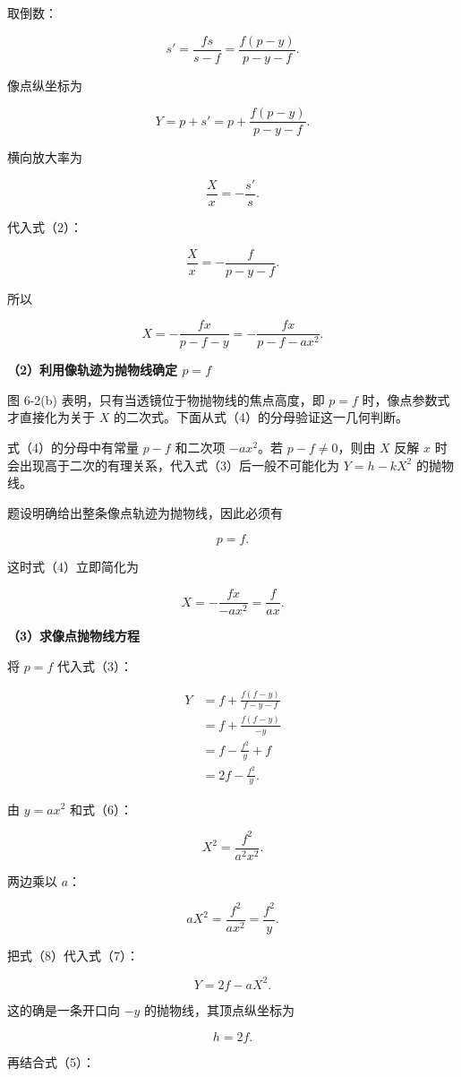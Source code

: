 \documentclass[12pt,a4paper,UTF8]{ctexart}
\begin{document}
取倒数：

\[
s'=\frac{fs}{s-f}
=\frac{f(p-y)}{p-y-f}.\tag{2}
\]

像点纵坐标为

\[
Y=p+s'
=p+\frac{f(p-y)}{p-y-f}.\tag{3}
\]

横向放大率为

\[
\frac Xx=-\frac{s'}s.
\]

代入式（2）：

\[
\frac Xx=-\frac{f}{p-y-f}.
\]

所以

\[
X=-\frac{fx}{p-f-y}
=-\frac{fx}{p-f-ax^2}.\tag{4}
\]

\textbf{（2）利用像轨迹为抛物线确定 \(p=f\)}

图 6-2(b) 表明，只有当透镜位于物抛物线的焦点高度，即 \(p=f\)
时，像点参数式才直接化为关于 \(X\)
的二次式。下面从式（4）的分母验证这一几何判断。

式（4）的分母中有常量 \(p-f\) 和二次项 \(-ax^2\)。若 \(p-f\ne0\)，则由
\(X\) 反解 \(x\) 时会出现高于二次的有理关系，代入式（3）后一般不可能化为
\(Y=h-kX^2\) 的抛物线。

题设明确给出整条像点轨迹为抛物线，因此必须有

\[
\boxed{p=f}.\tag{5}
\]

这时式（4）立即简化为

\[
X=-\frac{fx}{-ax^2}
=\frac{f}{ax}.\tag{6}
\]

\textbf{（3）求像点抛物线方程}

将 \(p=f\) 代入式（3）：

\[
\begin{aligned}
Y
&=f+\frac{f(f-y)}{f-y-f}\\
&=f+\frac{f(f-y)}{-y}\\
&=f-\frac{f^2}{y}+f\\
&=2f-\frac{f^2}{y}.
\end{aligned}\tag{7}
\]

由 \(y=ax^2\) 和式（6）：

\[
X^2=\frac{f^2}{a^2x^2}.
\]

两边乘以 \(a\)：

\[
aX^2=\frac{f^2}{ax^2}=\frac{f^2}{y}.\tag{8}
\]

把式（8）代入式（7）：

\[
\boxed{Y=2f-aX^2}.\tag{9}
\]

这的确是一条开口向 \(-y\) 的抛物线，其顶点纵坐标为

\[
h=2f.\tag{10}
\]

再结合式（5）：
\end{document}
